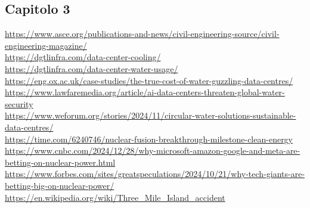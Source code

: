 \documentclass[12pt,a4paper,oneside]{book}
\begin{document}
\subsection*{Capitolo 3}
\url{https://www.asce.org/publications-and-news/civil-engineering-source/civil-engineering-magazine/} \\
\url{https://dgtlinfra.com/data-center-cooling/} \\
\url{https://dgtlinfra.com/data-center-water-usage/} \\
\url{https://eng.ox.ac.uk/case-studies/the-true-cost-of-water-guzzling-data-centres/} \\
\url{https://www.lawfaremedia.org/article/ai-data-centers-threaten-global-water-security} \\
\url{https://www.weforum.org/stories/2024/11/circular-water-solutions-sustainable-data-centres/}\\
\url{https://time.com/6240746/nuclear-fusion-breakthrough-milestone-clean-energy}\\
\url{https://www.cnbc.com/2024/12/28/why-microsoft-amazon-google-and-meta-are-betting-on-nuclear-power.html}\\
\url{https://www.forbes.com/sites/greatspeculations/2024/10/21/why-tech-giants-are-betting-big-on-nuclear-power/}\\
\url{https://en.wikipedia.org/wiki/Three_Mile_Island_accident}
\newpage
\end{document}
